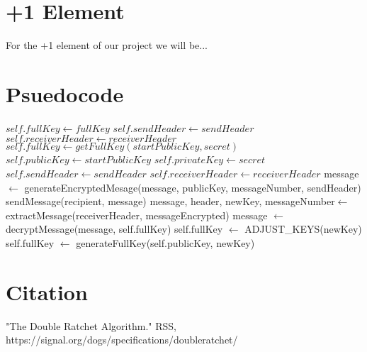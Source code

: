 \documentclass{article}
\begin{document}
\section{+1 Element}

For the +1 element of our project we will be...

\section{Psuedocode}

    \begin{algorithm}
    \begin{algorithmic}
		\State $self.fullKey \gets fullKey$
		\State $self.sendHeader \gets sendHeader$
		\State $self.receiverHeader \gets receiverHeader$
	\EndProcedure
		\State $self.fullKey \gets getFullKey(startPublicKey, secret)$
		\State $self.publicKey \gets startPublicKey$
		\State $self.privateKey \gets secret$
		\State $self.sendHeader \gets sendHeader$
		\State $self.receiverHeader \gets receiverHeader$
	\EndProcedure
		\State message $\gets$ generateEncryptedMesage(message, publicKey, messageNumber, sendHeader) 
		\State sendMessage(recipient, message)
	\EndProcedure
		\State message, header, newKey, messageNumber$\gets$ extractMessage(receiverHeader, messageEncrypted)
		\State message $\gets$ decryptMessage(message, self.fullKey) 
		\State self.fullKey $\gets$ ADJUST\_KEYS(newKey)
	\EndProcedure
		\State self.fullKey $\gets$ generateFullKey(self.publicKey, newKey)
	\EndProcedure
    	\end{algorithmic}
    \end{algorithm}

\section{Citation}

"The Double Ratchet Algorithm." RSS, https://signal.org/dogs/specifications/doubleratchet/


    
	
	    
\end{document}

